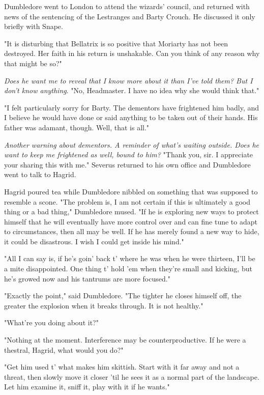 \documentclass[a4paper,11pt]{article}
\begin{document}
Dumbledore went to London to attend the wizards' council, and returned with news of the sentencing of the Lestranges and Barty Crouch. He discussed it only briefly with Snape.

"It is disturbing that Bellatrix is so positive that Moriarty has not been destroyed. Her faith in his return is unshakable. Can you think of any reason why that might be so?"

\emph{Does he want me to reveal that I know more about it than I've told them? But I don't know anything}. "No, Headmaster. I have no idea why she would think that."

"I felt particularly sorry for Barty. The dementors have frightened him badly, and I believe he would have done or said anything to be taken out of their hands. His father was adamant, though. Well, that is all."

\emph{Another warning about dementors. A reminder of what's waiting outside. Does he want to keep me frightened as well, bound to him?} "Thank you, sir. I appreciate your sharing this with me." Severus returned to his own office and Dumbledore went to talk to Hagrid.

Hagrid poured tea while Dumbledore nibbled on something that was supposed to resemble a scone. "The problem is, I am not certain if this is ultimately a good thing or a bad thing," Dumbledore mused. "If he is exploring new ways to protect himself that he will eventually have more control over and can fine tune to adapt to circumstances, then all may be well. If he has merely found a new way to hide, it could be disastrous. I wish I could get inside his mind."

"All I can say is, if he's goin' back t' where he was when he were thirteen, I'll be a mite disappointed. One thing t' hold 'em when they're small and kicking, but he's growed now and his tantrums are more focused."

"Exactly the point," said Dumbledore. "The tighter he closes himself off, the greater the explosion when it breaks through. It is not healthy."

"What're you doing about it?"

"Nothing at the moment. Interference may be counterproductive. If he were a thestral, Hagrid, what would you do?"

"Get him used t' what makes him skittish. Start with it far away and not a threat, then slowly move it closer 'til he sees it as a normal part of the landscape. Let him examine it, sniff it, play with it if he wants."
\end{document}
